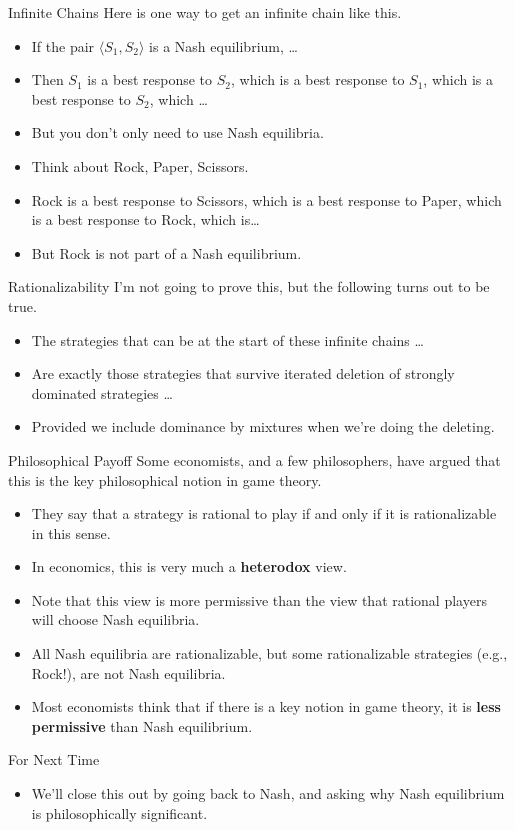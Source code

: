 \documentclass[
  ignorenonframetext,
]{beamer}
\providecommand{\tightlist}{%
  \setlength{\itemsep}{0pt}\setlength{\parskip}{0pt}}
\begin{document}
\begin{frame}{Infinite Chains}
\protect\hypertarget{infinite-chains}{}
Here is one way to get an infinite chain like this.

\begin{itemize}
\tightlist
\item
  If the pair \(\langle S_1, S_2 \rangle\) is a Nash equilibrium,
  \ldots{}
\item
  Then \(S_1\) is a best response to \(S_2\), which is a best response
  to \(S_1\), which is a best response to \(S_2\), which \ldots{} \pause
\item
  But you don't only need to use Nash equilibria.
\item
  Think about Rock, Paper, Scissors.
\item
  Rock is a best response to Scissors, which is a best response to
  Paper, which is a best response to Rock, which is\ldots{}
\item
  But Rock is not part of a Nash equilibrium.
\end{itemize}
\end{frame}

\begin{frame}{Rationalizability}
\protect\hypertarget{rationalizability}{}
I'm not going to prove this, but the following turns out to be true.

\begin{itemize}
\tightlist
\item
  The strategies that can be at the start of these infinite chains
  \ldots{}
\item
  Are exactly those strategies that survive iterated deletion of
  strongly dominated strategies \ldots{}
\item
  Provided we include dominance by mixtures when we're doing the
  deleting.
\end{itemize}
\end{frame}

\begin{frame}{Philosophical Payoff}
\protect\hypertarget{philosophical-payoff}{}
Some economists, and a few philosophers, have argued that this is the
key philosophical notion in game theory.

\begin{itemize}
\tightlist
\item
  They say that a strategy is rational to play if and only if it is
  rationalizable in this sense. \pause
\item
  In economics, this is very much a \textbf{heterodox} view.
\item
  Note that this view is more permissive than the view that rational
  players will choose Nash equilibria.
\item
  All Nash equilibria are rationalizable, but some rationalizable
  strategies (e.g., Rock!), are not Nash equilibria. \pause
\item
  Most economists think that if there is a key notion in game theory, it
  is \textbf{less permissive} than Nash equilibrium.
\end{itemize}
\end{frame}

\begin{frame}{For Next Time}
\protect\hypertarget{for-next-time}{}
\begin{itemize}
\tightlist
\item
  We'll close this out by going back to Nash, and asking why Nash
  equilibrium is philosophically significant.
\end{itemize}
\end{frame}
\end{document}
